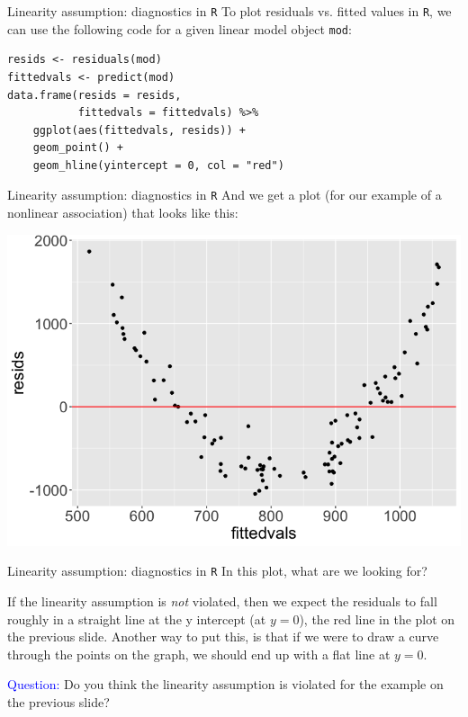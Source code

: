\documentclass[10pt,t]{beamer}
\begin{document}
\begin{frame}[fragile]{Linearity assumption: diagnostics in \texttt{R}}
To plot residuals vs. fitted values in \texttt{R}, we can use the following code for a given linear model object \texttt{mod}:

\vspace{0.2cm}

\begin{lstlisting}
resids <- residuals(mod)
fittedvals <- predict(mod)
data.frame(resids = resids,
           fittedvals = fittedvals) %>%
	ggplot(aes(fittedvals, resids)) +
	geom_point() +
	geom_hline(yintercept = 0, col = "red") 
\end{lstlisting}


\end{frame}

\begin{frame}{Linearity assumption: diagnostics in \texttt{R}}
And we get a plot (for our example of a nonlinear association) that looks like this:

\centering \includegraphics[scale=0.3]{fitted_resids.png}

\end{frame}

\begin{frame}{Linearity assumption: diagnostics in \texttt{R}}
In this plot, what are we looking for?

\vspace{0.3cm}

If the linearity assumption is \textit{not} violated, then we expect the residuals to fall roughly in a straight line at the y intercept (at $y = 0$), the red line in the plot on the previous slide. Another way to put this, is that if we were to draw a curve through the points on the graph, we should end up with a flat line at $y = 0$.

\vspace{0.3cm}

\textcolor{blue}{Question:} Do you think the linearity assumption is violated for the example on the previous slide?

\end{frame}
\end{document}
